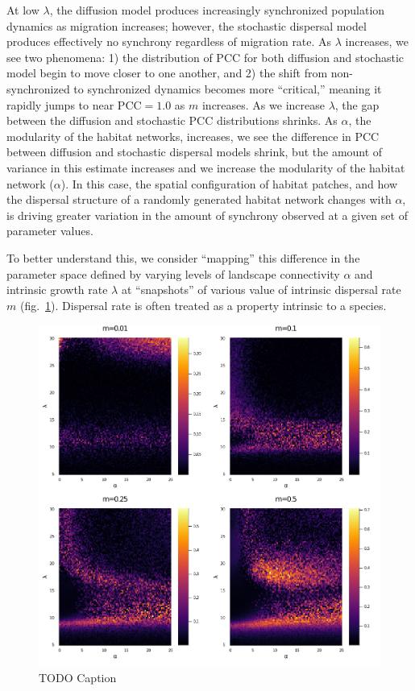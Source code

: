 \documentclass[11pt]{article}
\makeatletter
\def\maxwidth{\ifdim\Gin@nat@width>\linewidth\linewidth
\else\Gin@nat@width\fi}
\let\Oldincludegraphics\includegraphics
\renewcommand{\includegraphics}[1]{\Oldincludegraphics[width=\maxwidth]{#1}}
\makeatother
\begin{document}
At low \(\lambda\), the diffusion model produces increasingly
synchronized population dynamics as migration increases; however, the
stochastic dispersal model produces effectively no synchrony regardless
of migration rate. As \(\lambda\) increases, we see two phenomena: 1)
the distribution of \(\text{PCC}\) for both diffusion and stochastic
model begin to move closer to one another, and 2) the shift from
non-synchronized to synchronized dynamics becomes more ``critical,''
meaning it rapidly jumps to near \(\text{PCC}=1.0\) as \(m\) increases.
As we increase \(\lambda\), the gap between the diffusion and stochastic
PCC distributions shrinks. As \(\alpha\), the modularity of the habitat
networks, increases, we see the difference in PCC between diffusion and
stochastic dispersal models shrink, but the amount of variance in this
estimate increases and we increase the modularity of the habitat network
(\(\alpha\)). In this case, the spatial configuration of habitat
patches, and how the dispersal structure of a randomly generated habitat
network changes with \(\alpha\), is driving greater variation in the
amount of synchrony observed at a given set of parameter values.

To better understand this, we consider ``mapping'' this difference in
the parameter space defined by varying levels of landscape connectivity
\(\alpha\) and intrinsic growth rate \(\lambda\) at ``snapshots'' of
various value of intrinsic dispersal rate \(m\)
(fig.~\ref{fig:lattice}). Dispersal rate is often treated as a property
intrinsic to a species.

\begin{figure}
\hypertarget{fig:lattice}{%
\centering
\includegraphics{./figures/connectivity_demography_lattice.png}
\caption{TODO Caption}\label{fig:lattice}
}
\end{figure}
\end{document}
